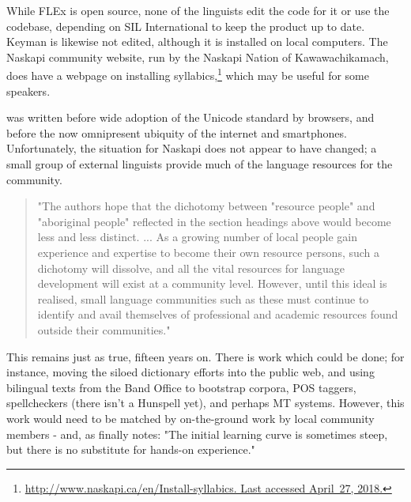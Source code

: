 While FLEx is open source, none of the linguists edit the code for it or use the codebase, depending on SIL International to keep the product up to date. Keyman is likewise not edited, although it is installed on local computers. The Naskapi community website, run by the Naskapi Nation of Kawawachikamach, does have a webpage on installing syllabics,\footnote{\href{http://www.naskapi.ca/en/Install-syllabics}{http://www.naskapi.ca/en/Install-syllabics. Last accessed April~27, 2018.}} which may be useful for some speakers.

\citet{jancewicz2002applied} was written before wide adoption of the Unicode standard by browsers, and before the now omnipresent ubiquity of the internet and smartphones. Unfortunately, the situation for Naskapi does not appear to have changed; a small group of external linguists provide much of the language resources for the community. 

\begin{quote}
"The authors hope that the dichotomy between "resource people" and "aboriginal people" reflected in the section headings above would become less and less distinct. ... As a growing number of local people gain experience and expertise to become their own resource persons, such a dichotomy will dissolve, and all the vital resources for language development will exist at a community level. However, until this ideal is realised, small language communities such as these must continue to identify and avail themselves of professional and academic resources found outside their communities." \citep[89]{jancewicz2002applied}
\end{quote}

This remains just as true, fifteen years on. There is work which could be done; for instance, moving the siloed dictionary efforts into the public web, and using bilingual texts from the Band Office to bootstrap corpora, POS taggers, spellcheckers (there isn't a Hunspell yet), and perhaps MT systems. However, this work would need to be matched by on-the-ground work by local community members - and, as \citet[90]{jancewicz2002applied} finally notes: "The initial learning curve is sometimes steep, but there is no substitute for hands-on experience."

